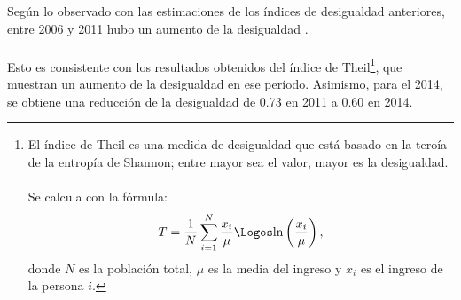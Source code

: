   Según lo observado con las estimaciones de los índices de desigualdad anteriores, entre 2006 y 2011 hubo  un aumento de la desigualdad .\\ \\ 
 Esto es consistente con los resultados obtenidos del índice de Theil\footnote{El índice de Theil es una medida de desigualdad que está basado en la teroía de la entropía de Shannon; entre mayor sea el valor, mayor es la desigualdad. \\\\ Se calcula con la fórmula: \[ T =\frac{1}{N} \sum_{i=1}^{N}\frac{x_i}{\mu}\Logos\mbox{ln} \left(\frac{x_i}{\mu}\right), \] donde $N$ es la población total, $\mu$ es la media del ingreso y $x_i$ es el ingreso de la persona $i$.}, que muestran un aumento de la desigualdad en ese período. Asimismo, para el 2014, se obtiene una reducción de la desigualdad de 0.73 en 2011 a 0.60 en 2014.